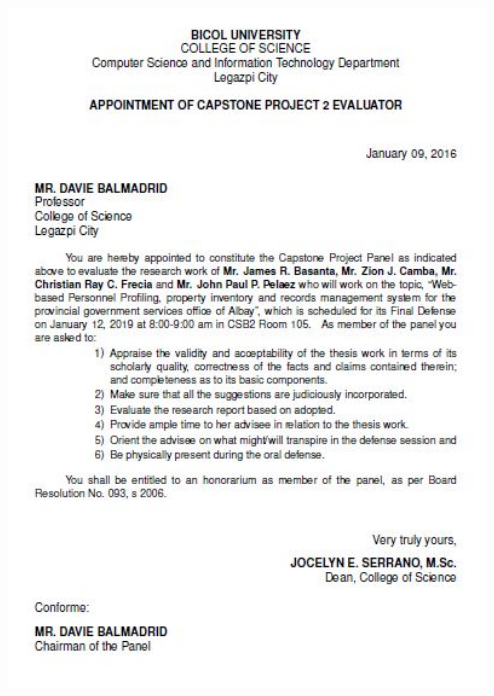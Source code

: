 \newpage



\begin{center} 
	\includegraphics[width=14cm,height=18cm]{image/a2.JPG}
\end{center}

\newpage



